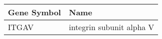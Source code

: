 \begin{tabular}{ll}
\toprule
Gene Symbol &                     Name \\
\midrule
      ITGAV & integrin subunit alpha V \\
\bottomrule
\end{tabular}
